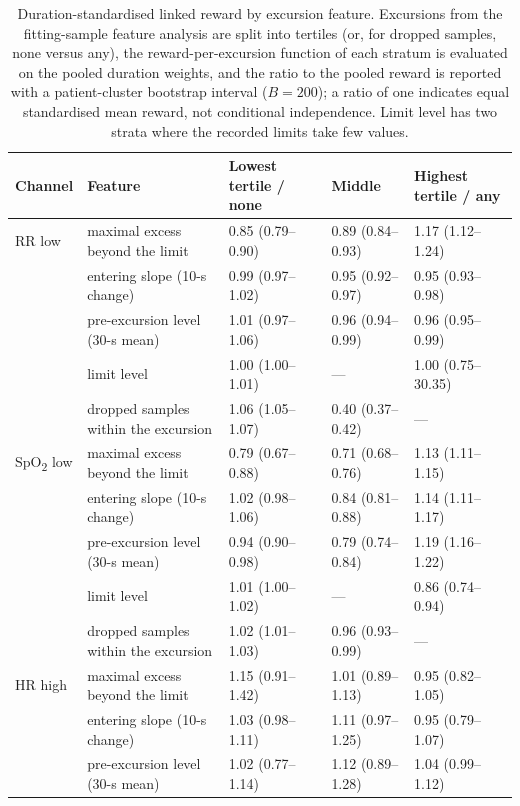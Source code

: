 \documentclass[11pt,letterpaper]{article}
\newcommand{\SpO}{SpO\textsubscript{2}}\newcommand{\tightnote}[1]{\par\smallskip{\footnotesize\raggedright #1\par}}
\begin{document}
\begin{table}[htbp]\centering\footnotesize
\setlength{\tabcolsep}{4pt}
\caption{Duration-standardised linked reward by excursion feature. Excursions from the fitting-sample feature analysis are split into tertiles (or, for dropped samples, none
versus any), the reward-per-excursion function of each stratum is evaluated on the pooled duration weights,
and the ratio to the pooled reward is reported with a patient-cluster bootstrap interval ($B=200$); a ratio of one indicates equal standardised mean reward, not conditional independence. Limit level has two strata where the recorded
limits take few values.}
\label{tab:suff}
\begin{tabular}{@{}lllll@{}}
\toprule
Channel & Feature & Lowest tertile / none & Middle & Highest tertile / any \\
\midrule
RR low & maximal excess beyond the limit & 0.85 (0.79--0.90) & 0.89 (0.84--0.93) & 1.17 (1.12--1.24) \\
 & entering slope (10-s change) & 0.99 (0.97--1.02) & 0.95 (0.92--0.97) & 0.95 (0.93--0.98) \\
 & pre-excursion level (30-s mean) & 1.01 (0.97--1.06) & 0.96 (0.94--0.99) & 0.96 (0.95--0.99) \\
 & limit level & 1.00 (1.00--1.01) & --- & 1.00 (0.75--30.35) \\
 & dropped samples within the excursion & 1.06 (1.05--1.07) & 0.40 (0.37--0.42) & --- \\
\addlinespace
\SpO{} low & maximal excess beyond the limit & 0.79 (0.67--0.88) & 0.71 (0.68--0.76) & 1.13 (1.11--1.15) \\
 & entering slope (10-s change) & 1.02 (0.98--1.06) & 0.84 (0.81--0.88) & 1.14 (1.11--1.17) \\
 & pre-excursion level (30-s mean) & 0.94 (0.90--0.98) & 0.79 (0.74--0.84) & 1.19 (1.16--1.22) \\
 & limit level & 1.01 (1.00--1.02) & --- & 0.86 (0.74--0.94) \\
 & dropped samples within the excursion & 1.02 (1.01--1.03) & 0.96 (0.93--0.99) & --- \\
\addlinespace
HR high & maximal excess beyond the limit & 1.15 (0.91--1.42) & 1.01 (0.89--1.13) & 0.95 (0.82--1.05) \\
 & entering slope (10-s change) & 1.03 (0.98--1.11) & 1.11 (0.97--1.25) & 0.95 (0.79--1.07) \\
 & pre-excursion level (30-s mean) & 1.02 (0.77--1.14) & 1.12 (0.89--1.28) & 1.04 (0.99--1.12) \\

\end{tabular}
\end{table}
\end{document}
